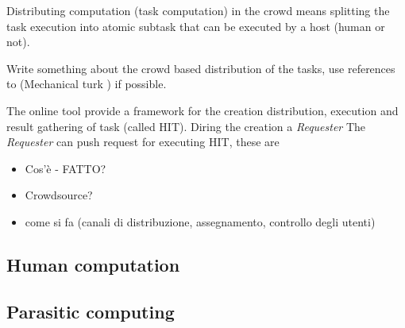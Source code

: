Distributing computation (task computation) in the crowd means splitting
the task execution into atomic subtask that can be executed by a host
(human or not).

Write something about the crowd based distribution of the tasks, use references
to (Mechanical turk \cite{little2010turkit}) if possible.

The online tool  provide a framework for the creation
distribution, execution and result gathering of task (called \ac{HIT}).
Diring the creation a \emph{Requester} 
The \emph{Requester} can push request for executing \ac{HIT}, these are 

\begin{itemize}
	\item Cos'è - FATTO?
	\item Crowdsource?
	\item come si fa (canali di distribuzione, assegnamento, controllo degli utenti)
\end{itemize}


\subsection{Human computation}
\label{sec:bg:crowd:human}


\subsection{Parasitic computing}
\label{sec:bg:crowd:parasitic}
